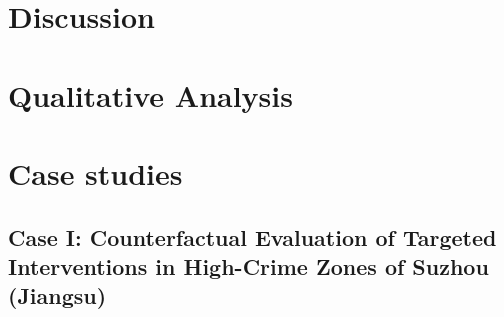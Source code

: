 \section{Discussion}
\section{Qualitative Analysis}


\section{Case studies}

\subsection{Case I: Counterfactual Evaluation of Targeted Interventions in High-Crime Zones of Suzhou (Jiangsu)}

